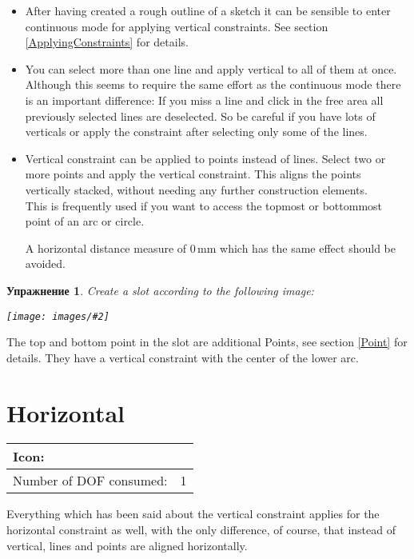 \documentclass[12pt,titlepage]{article}
\newcommand{\icon}[1]{\raisebox{-1em}{\rule{0pt}{27pt}\texttt{[image: images/\#1]}}}
\newcommand{\img}[2]{\vspace{2ex}\noindent\texttt{[image: images/\#2]}}
\newcommand{\dofConsumed}{Number of DOF consumed:}
\newtheorem{Exercise}{Упражнение}
\begin{document}
\begin{itemize}
\item After having created a rough outline of a sketch it can be sensible to enter
      continuous mode for applying vertical constraints. See section
      \vref{ApplyingConstraints} for details.
\item You can select more than one line and apply vertical to all of them at once.
      Although this seems to require the same effort as the continuous mode there is
      an important difference: If you miss a line and click in the free area all
      previously selected lines are deselected. So be careful if you have lots of
      verticals or apply the constraint after selecting only some of the lines.
\item Vertical constraint can be applied to points instead of lines. Select two or
      more points and apply the vertical constraint. This aligns the points
      vertically stacked, without needing any further construction elements.\\      
      This is frequently used if you want to access the topmost or bottommost point
      of an arc or circle.
      
      A horizontal distance measure of 0\,mm which has the same effect should be avoided.
\end{itemize}

\begin{Exercise}
Create a slot according to the following image:

\img{scale=0.7}{VerticalPoints}
\end{Exercise}
The top and bottom point in the slot are additional Points, see section \vref{Point}
for details. They have a vertical constraint with the center of the lower arc.


\section{Horizontal}
\label{Horizontal}
\begin{tabular}{|l|l|}
\hline
Icon: & \icon{Constraint_Horizontal}\\
\hline
\dofConsumed & 1 \\
\hline
\end{tabular}

Everything which has been said about the vertical constraint applies for the
horizontal constraint as well, with the only difference, of course, that instead of
vertical, lines and points are aligned horizontally.
\end{document}
